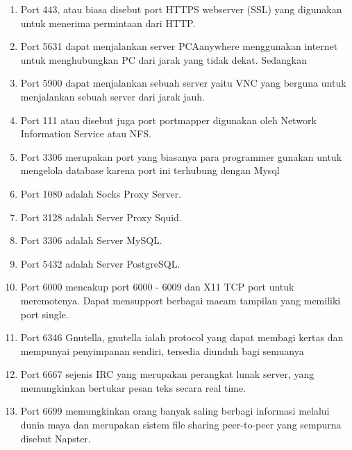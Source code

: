 \documentclass[12pt,a4paper]{article}
\begin{document}
\begin{enumerate}
\item Port 443, atau biasa disebut port HTTPS webserver (SSL) yang digunakan untuk menerima permintaan dari HTTP.
\item Port 5631 dapat menjalankan server PCAanywhere menggunakan internet untuk menghubungkan PC dari jarak yang tidak dekat.
Sedangkan 
\item Port 5900 dapat menjalankan sebuah server yaitu VNC yang berguna untuk menjalankan sebuah server dari jarak jauh.
\item Port 111 atau disebut juga port portmapper digunakan oleh Network Information Service atau NFS.
\item Port 3306 merupakan port yang biasanya para programmer gunakan untuk mengelola database karena port ini terhubung dengan Mysql
\item Port 1080 adalah Socks Proxy Server.
\item Port 3128 adalah Server Proxy Squid.
\item Port 3306 adalah Server MySQL.
\item Port 5432 adalah Server PostgreSQL.
\item Port 6000 mencakup port 6000 - 6009 dan X11 TCP port untuk meremotenya. Dapat mensupport berbagai macam tampilan yang memiliki port single.
\item Port 6346 Gnutella, gnutella ialah protocol yang dapat membagi kertas dan mempunyai penyimpanan sendiri, tersedia diunduh bagi semuanya
\item Port 6667 sejenis IRC yang merupakan perangkat lunak server, yang memungkinkan bertukar pesan teks secara real time.
\item Port 6699 memungkinkan orang banyak saling berbagi informasi melalui dunia maya dan  merupakan sistem file sharing peer-to-peer yang sempurna  disebut Napster.


\end{enumerate}
\end{document}
